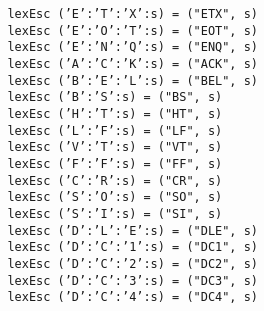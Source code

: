 \mbox{\tt \ \ \ \ \ \ \ \ \ \ \ \ \ \ \ \ \ \ \ \ \ \ \ \ \ \ \ \ lexEsc\ ('E':'T':'X':s)\ =\ ("ETX",\ s)}\\
\mbox{\tt \ \ \ \ \ \ \ \ \ \ \ \ \ \ \ \ \ \ \ \ \ \ \ \ \ \ \ \ lexEsc\ ('E':'O':'T':s)\ =\ ("EOT",\ s)}\\
\mbox{\tt \ \ \ \ \ \ \ \ \ \ \ \ \ \ \ \ \ \ \ \ \ \ \ \ \ \ \ \ lexEsc\ ('E':'N':'Q':s)\ =\ ("ENQ",\ s)}\\
\mbox{\tt \ \ \ \ \ \ \ \ \ \ \ \ \ \ \ \ \ \ \ \ \ \ \ \ \ \ \ \ lexEsc\ ('A':'C':'K':s)\ =\ ("ACK",\ s)}\\
\mbox{\tt \ \ \ \ \ \ \ \ \ \ \ \ \ \ \ \ \ \ \ \ \ \ \ \ \ \ \ \ lexEsc\ ('B':'E':'L':s)\ =\ ("BEL",\ s)}\\
\mbox{\tt \ \ \ \ \ \ \ \ \ \ \ \ \ \ \ \ \ \ \ \ \ \ \ \ \ \ \ \ lexEsc\ ('B':'S':s)\ =\ ("BS",\ s)}\\
\mbox{\tt \ \ \ \ \ \ \ \ \ \ \ \ \ \ \ \ \ \ \ \ \ \ \ \ \ \ \ \ lexEsc\ ('H':'T':s)\ =\ ("HT",\ s)}\\
\mbox{\tt \ \ \ \ \ \ \ \ \ \ \ \ \ \ \ \ \ \ \ \ \ \ \ \ \ \ \ \ lexEsc\ ('L':'F':s)\ =\ ("LF",\ s)}\\
\mbox{\tt \ \ \ \ \ \ \ \ \ \ \ \ \ \ \ \ \ \ \ \ \ \ \ \ \ \ \ \ lexEsc\ ('V':'T':s)\ =\ ("VT",\ s)}\\
\mbox{\tt \ \ \ \ \ \ \ \ \ \ \ \ \ \ \ \ \ \ \ \ \ \ \ \ \ \ \ \ lexEsc\ ('F':'F':s)\ =\ ("FF",\ s)}\\
\mbox{\tt \ \ \ \ \ \ \ \ \ \ \ \ \ \ \ \ \ \ \ \ \ \ \ \ \ \ \ \ lexEsc\ ('C':'R':s)\ =\ ("CR",\ s)}\\
\mbox{\tt \ \ \ \ \ \ \ \ \ \ \ \ \ \ \ \ \ \ \ \ \ \ \ \ \ \ \ \ lexEsc\ ('S':'O':s)\ =\ ("SO",\ s)}\\
\mbox{\tt \ \ \ \ \ \ \ \ \ \ \ \ \ \ \ \ \ \ \ \ \ \ \ \ \ \ \ \ lexEsc\ ('S':'I':s)\ =\ ("SI",\ s)}\\
\mbox{\tt \ \ \ \ \ \ \ \ \ \ \ \ \ \ \ \ \ \ \ \ \ \ \ \ \ \ \ \ lexEsc\ ('D':'L':'E':s)\ =\ ("DLE",\ s)}\\
\mbox{\tt \ \ \ \ \ \ \ \ \ \ \ \ \ \ \ \ \ \ \ \ \ \ \ \ \ \ \ \ lexEsc\ ('D':'C':'1':s)\ =\ ("DC1",\ s)}\\
\mbox{\tt \ \ \ \ \ \ \ \ \ \ \ \ \ \ \ \ \ \ \ \ \ \ \ \ \ \ \ \ lexEsc\ ('D':'C':'2':s)\ =\ ("DC2",\ s)}\\
\mbox{\tt \ \ \ \ \ \ \ \ \ \ \ \ \ \ \ \ \ \ \ \ \ \ \ \ \ \ \ \ lexEsc\ ('D':'C':'3':s)\ =\ ("DC3",\ s)}\\
\mbox{\tt \ \ \ \ \ \ \ \ \ \ \ \ \ \ \ \ \ \ \ \ \ \ \ \ \ \ \ \ lexEsc\ ('D':'C':'4':s)\ =\ ("DC4",\ s)}\\
